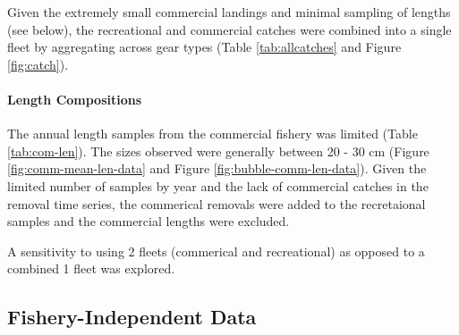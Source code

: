 \documentclass[11pt,
  english,
  a4paper,
]{article}
\begin{document}
\leavevmode\tagmcend\tagstructend\par


Given the extremely small commercial landings and minimal sampling of lengths (see below), the recreational and commercial catches were combined into a single fleet by aggregating across gear types (Table \ref{tab:allcatches} and Figure \ref{fig:catch}).

\leavevmode\tagmcend\tagstructend\par


\hypertarget{length-compositions-1}{%
\paragraph{Length Compositions}\label{length-compositions-1}}

\leavevmode\tagmcend\tagstructend


The annual length samples from the commercial fishery was limited (Table \ref{tab:com-len}). The sizes observed were generally between 20 - 30 cm (Figure \ref{fig:comm-mean-len-data} and Figure \ref{fig:bubble-comm-len-data}). Given the limited number of samples by year and the lack of commercial catches in the removal time series, the commerical removals were added to the recretaional samples and the commercial lengths were excluded.

\leavevmode\tagmcend\tagstructend\par


A sensitivity to using 2 fleets (commerical and recreational) as opposed to a combined 1 fleet was explored.

\leavevmode\tagmcend\tagstructend\par


\hypertarget{fishery-independent-data}{%
\subsection{Fishery-Independent Data}\label{fishery-independent-data}}

\leavevmode\tagmcend\tagstructend

\end{document}
